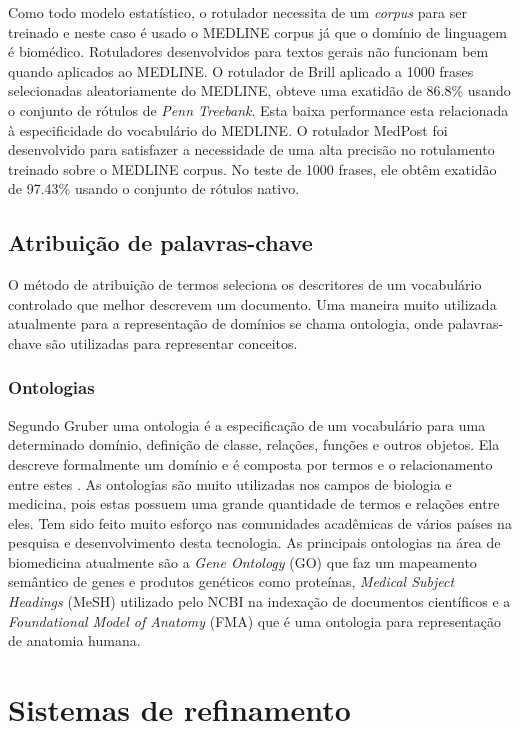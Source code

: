 Como todo modelo estatístico, o rotulador necessita de um \emph{corpus} para ser treinado e neste caso é usado o MEDLINE corpus já que o domínio de linguagem é biomédico. Rotuladores desenvolvidos para textos gerais não funcionam bem quando aplicados ao MEDLINE. O rotulador de Brill \cite{Brill1992} aplicado a 1000 frases selecionadas aleatoriamente do MEDLINE, obteve uma exatidão de 86.8\% usando o conjunto de rótulos de \emph{Penn Treebank}. Esta baixa performance esta relacionada à especificidade do vocabulário do MEDLINE. O rotulador MedPost \cite{Smith2004} foi desenvolvido para satisfazer a necessidade de uma alta precisão no rotulamento treinado sobre o MEDLINE corpus. No teste de 1000 frases, ele obtêm exatidão de 97.43\% usando o conjunto de rótulos nativo.

\subsection{Atribuição de palavras-chave}
O método de atribuição de termos seleciona os descritores de um vocabulário controlado que melhor descrevem um documento. Uma maneira muito utilizada atualmente para a representação de domínios se chama ontologia, onde palavras-chave são utilizadas para representar conceitos.

\subsubsection{Ontologias}

 Segundo Gruber \cite{Gruber1993} uma ontologia é a especificação de um vocabulário para uma determinado domínio, definição de classe, relações, funções e outros objetos. Ela descreve formalmente um domínio e é composta por termos e o relacionamento entre estes \cite{Antoniou2004}. As ontologias são muito utilizadas nos campos de biologia e medicina, pois estas possuem uma grande quantidade de termos e relações entre eles. Tem sido feito muito esforço nas comunidades acadêmicas de vários países na pesquisa e desenvolvimento desta tecnologia. As principais ontologias na área de biomedicina atualmente são a \emph{Gene Ontology} (GO) \cite{GO2000} que faz um mapeamento semântico de genes e produtos genéticos como proteínas, \emph{Medical Subject Headings} (MeSH) \cite{MESH2000} utilizado pelo NCBI na indexação de documentos científicos e a \emph{Foundational Model of Anatomy}  (FMA) \cite{FMA2003} que é uma ontologia para representação de anatomia humana.

\section{Sistemas de refinamento}

